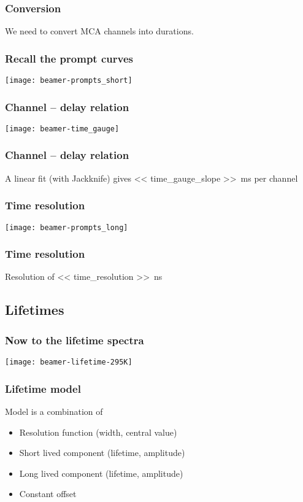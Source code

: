 \documentclass[english, fleqn]{beamer}
\begin{document}
\begin{frame}
    \frametitle{Conversion}

    We need to convert MCA channels into durations.
\end{frame}

\begin{frame}
    \frametitle{Recall the prompt curves}

    \centering
    \texttt{[image: beamer-prompts\_short]}
\end{frame}

\begin{frame}
    \frametitle{Channel -- delay relation}

    \centering
    \texttt{[image: beamer-time\_gauge]}
\end{frame}

\begin{frame}
    \frametitle{Channel -- delay relation}

    A linear fit (with Jackknife) gives
    \SI{<< time_gauge_slope >>}{\milli\second} per channel
\end{frame}


\begin{frame}
    \frametitle{Time resolution}

    \centering
    \texttt{[image: beamer-prompts\_long]}
\end{frame}

\begin{frame}
    \frametitle{Time resolution}

    Resolution of \SI{<< time_resolution >>}{\nano\second}
\end{frame}

\subsection{Lifetimes}

\begin{frame}
    \frametitle{Now to the lifetime spectra}
    
    \centering
    \texttt{[image: beamer-lifetime-295K]}
\end{frame}

\begin{frame}
    \frametitle{Lifetime model}

    Model is a combination of
    \begin{itemize}
        \item Resolution function (width, central value)
        \item Short lived component (lifetime, amplitude)
        \item Long lived component (lifetime, amplitude)
        \item Constant offset
    \end{itemize}
\end{frame}
\end{document}
